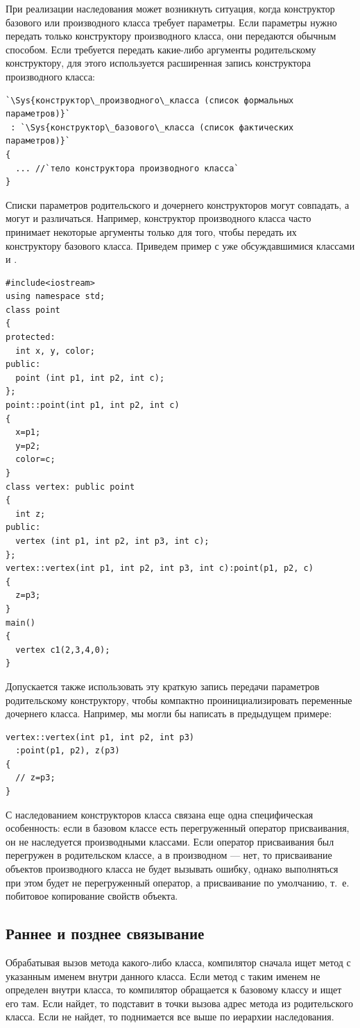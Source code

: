 При реализации наследования может возникнуть ситуация, когда конструктор базового или производного класса требует
параметры. Если параметры нужно передать только конструктору производного класса, они передаются обычным способом. Если
требуется передать какие-либо аргументы родительскому конструктору, для этого используется расширенная запись
конструктора производного класса:
\begin{lstlisting}
`\Sys{конструктор\_производного\_класса (список формальных параметров)}`
 : `\Sys{конструктор\_базового\_класса (список фактических параметров)}`
{
  ... //`тело конструктора производного класса`
}
\end{lstlisting}

Списки параметров родительского и дочернего конструкторов могут совпадать, а могут и различаться. Например, конструктор
производного класса часто принимает некоторые аргументы только для того, чтобы передать их конструктору базового
класса. Приведем пример с уже обсуждавшимися классами  и .
\begin{lstlisting}
#include<iostream>
using namespace std;
class point 
{
protected:
  int x, y, color;
public:
  point (int p1, int p2, int c);
};
point::point(int p1, int p2, int c) 
{
  x=p1; 
  y=p2;
  color=c;
}
class vertex: public point 
{
  int z;
public:
  vertex (int p1, int p2, int p3, int c);
};
vertex::vertex(int p1, int p2, int p3, int c):point(p1, p2, c) 
{ 
  z=p3; 
}
main() 
{
  vertex c1(2,3,4,0);
}
\end{lstlisting}

Допускается также использовать эту краткую запись передачи параметров родительскому конструктору, чтобы компактно
проинициализировать переменные дочернего класса. Например, мы могли бы написать в предыдущем примере:
\begin{lstlisting}
vertex::vertex(int p1, int p2, int p3)
  :point(p1, p2), z(p3) 
{ 
  // z=p3;
}
\end{lstlisting}

С наследованием конструкторов класса связана еще одна специфическая особенность: если в базовом классе есть
перегруженный оператор присваивания, он не наследуется производными классами. Если оператор присваивания был перегружен
в родительском классе, а в производном --- нет, то присваивание объектов производного класса не будет вызывать ошибку,
однако выполняться при этом будет не перегруженный оператор, а присваивание по умолчанию, т.~е. побитовое копирование
свойств объекта.

\subsection[Раннее и позднее связывание]{Раннее и позднее связывание}
Обрабатывая вызов метода какого-либо класса, компилятор сначала ищет метод с указанным именем внутри данного класса.
Если метод с таким именем не определен внутри класса, то компилятор обращается к базовому классу и ищет его там. Если
найдет, то подставит в точки вызова адрес метода из родительского класса. Если не найдет, то поднимается все выше по
иерархии наследования.

